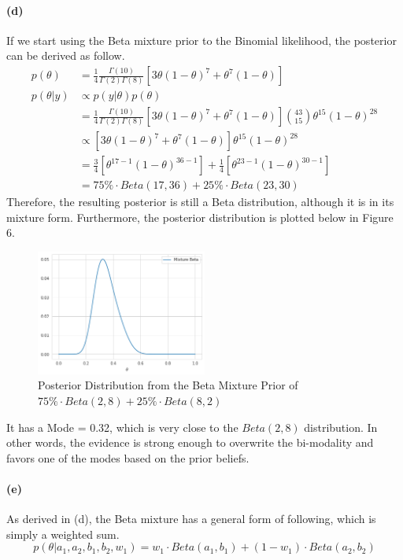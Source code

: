 \documentclass[11pt, letterpaper]{article}
\begin{document}
\paragraph{(d)}
If we start using the Beta mixture prior to the Binomial likelihood, the posterior can be derived as follow.
\begin{align*}
    p(\theta) &= \frac{1}{4}\frac{\Gamma(10)}{\Gamma(2)\Gamma(8)}[3\theta{(1-\theta)}^7+\theta^7(1-\theta)] \\
    p(\theta|y) &\propto p(y|\theta)p(\theta) \\
        &= \frac{1}{4}\frac{\Gamma(10)}{\Gamma(2)\Gamma(8)}[3\theta{(1-\theta)}^7+\theta^7(1-\theta)] {43 \choose 15}\theta^{15}{(1-\theta)}^{28} \\
        &\propto [3\theta{(1-\theta)}^7+\theta^7(1-\theta)] \theta^{15}{(1-\theta)}^{28} \\
        &= \frac{3}{4}[\theta^{17-1}{(1-\theta)}^{36-1}] + \frac{1}{4}[\theta^{23-1}{(1-\theta)}^{30-1}] \\
        &= 75\% \cdot Beta(17, 36) + 25\% \cdot Beta(23, 30)
\end{align*}
Therefore, the resulting posterior is still a Beta distribution, although it is in its mixture form.
Furthermore, the posterior distribution is plotted below in Figure 6.

\begin{figure}[h]
    \captionsetup{justification=centering, margin=2cm}
    \centering
    \includegraphics[width=0.5\textwidth]{hw2_3.4.d.png}
    \caption{Posterior Distribution from the Beta Mixture Prior of $75\% \cdot Beta(2, 8) + 25\% \cdot Beta(8, 2)$}
\end{figure}

It has a Mode = 0.32, which is very close to the $Beta(2, 8)$ distribution. In other words, the evidence is 
strong enough to overwrite the bi-modality and favors one of the modes based on the prior beliefs.

\paragraph{(e)}
As derived in (d), the Beta mixture has a general form of following, which is simply a weighted sum.
\[
    p(\theta|a_1, a_2, b_1, b_2, w_1) = w_1\cdot Beta(a_1, b_1) + (1-w_1) \cdot Beta(a_2, b_2)
\]
\end{document}
